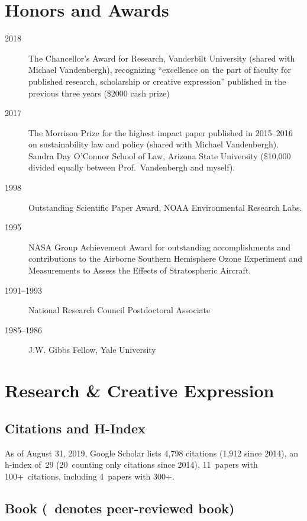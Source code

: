\documentclass[10pt]{article}
\begin{document}
\section{Honors and Awards}
\begin{description}
\item[2018] The Chancellor's Award for Research, Vanderbilt University (shared with Michael Vandenbergh), recognizing ``excellence on the part of faculty for published research, scholarship or creative expression'' published in the previous three years (\$2000 cash prize)
\item[2017] The Morrison Prize for the highest impact paper published in 2015--2016 on sustainability law and policy (shared with Michael Vandenbergh). Sandra Day O'Connor School of Law, Arizona State University (\$10,000 divided equally between Prof.\ Vandenbergh and myself).
\item[1998] Outstanding Scientific Paper Award, NOAA Environmental Research Labs.
\item[1995] NASA Group Achievement Award for outstanding accomplishments and contributions to the Airborne Southern Hemisphere Ozone Experiment and Measurements to Assess the Effects of Stratospheric Aircraft.
\item[1991--1993] National Research Council Postdoctoral Associate
\item[1985--1986] J.W. Gibbs Fellow, Yale University
\end{description}

\section{Research \& Creative Expression}
    \subsection{Citations and H-Index}
    As of August 31, 2019, Google Scholar lists
    4,798 citations (1,912 since 2014),
    an h-index of~29 (20~counting only citations since 2014),
    11~papers with 100+~citations, including 4~papers with 300+.
    \nocite{*}%
	\subsection[Book]{Book (\textdagger\ denotes peer-reviewed book)}
        \begin{refsection}
            \nocite{*}
            \printbibliography[heading=none,type=book]
        \end{refsection}
\end{document}
